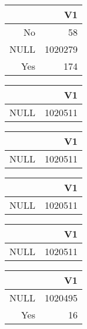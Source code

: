\bigskip\bigskip
\centering
\begin{tabular}{rr}
  \hline
 & V1 \\ 
  \hline
No &  58 \\ 
  NULL & 1020279 \\ 
  Yes & 174 \\ 
   \hline
\end{tabular}

\bigskip\bigskip
\centering
\begin{tabular}{rr}
  \hline
 & V1 \\ 
  \hline
NULL & 1020511 \\ 
   \hline
\end{tabular}

\bigskip\bigskip
\centering
\begin{tabular}{rr}
  \hline
 & V1 \\ 
  \hline
NULL & 1020511 \\ 
   \hline
\end{tabular}

\bigskip\bigskip
\centering
\begin{tabular}{rr}
  \hline
 & V1 \\ 
  \hline
NULL & 1020511 \\ 
   \hline
\end{tabular}

\bigskip\bigskip
\centering
\begin{tabular}{rr}
  \hline
 & V1 \\ 
  \hline
NULL & 1020511 \\ 
   \hline
\end{tabular}

\bigskip\bigskip
\centering
\begin{tabular}{rr}
  \hline
 & V1 \\ 
  \hline
NULL & 1020495 \\ 
  Yes &  16 \\ 
   \hline
\end{tabular}

